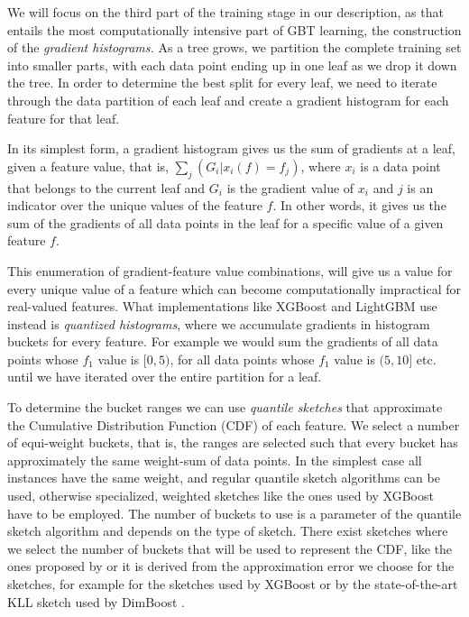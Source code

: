 We will focus on the third part of the training stage in our description, as that entails the most
computationally intensive part of GBT learning, the construction of the \emph{gradient histograms.}
As a tree grows, we partition the complete training set into smaller parts, with each data
point ending up in one leaf as we drop it down the tree.
In order to determine the best split for every leaf, we need to iterate through the data
partition of each leaf and create a gradient histogram for each feature for that leaf.

In its simplest form, a gradient histogram gives us the sum of gradients at a leaf,
given a feature value, that is, $\sum_{j}(G_i | x_i(f) = f_j)$, where $x_i$ is a data point
that belongs to the current leaf and  $G_i$ is the gradient value of $x_i$ and $j$ is an
indicator over the unique values of the feature $f$. In other words, it gives us the
sum of the gradients of all data points in the leaf for a specific value of a given
feature $f$.

This enumeration of gradient-feature value combinations, will give us a value for every unique value
of a feature which can become computationally impractical for real-valued features.
What implementations like XGBoost and LightGBM use instead is \emph{quantized histograms},
where we accumulate gradients in histogram buckets for every feature. For example
we would sum the gradients of all data points whose $f_1$ value is $[0, 5)$, for all
data points whose $f_1$ value is $(5, 10]$ etc. until we have iterated over
the entire partition for a leaf.

To determine the bucket ranges we
can use \emph{quantile sketches} \cite{greenwald2016quantiles} that approximate
the Cumulative Distribution Function (CDF) of each feature. We select a number of
equi-weight buckets, that is, the ranges are selected such that every bucket
has approximately the same weight-sum of data points. In the simplest case
all instances have the same weight, and regular quantile sketch algorithms
can be used, otherwise specialized, weighted sketches like the ones used by XGBoost
have to be employed.
The number of buckets to use is a
parameter of the quantile sketch algorithm and depends on the type of sketch.
There exist sketches where we select the number of buckets that
will be used to represent the CDF, like the ones proposed by \citet{BenHaim2010parallel}
or it is derived from the approximation error we choose for the sketches, for example
for the sketches used by XGBoost or by the state-of-the-art KLL sketch \cite{karnin2016kll}
used by DimBoost \cite{dimboost}.


